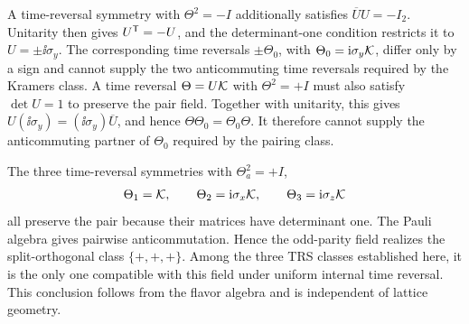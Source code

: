 A time-reversal symmetry with $\Theta^2=-I$ additionally satisfies $\overline U U=-I_2$. Unitarity then gives $U^{\mathsf{T}}=-U$, and the determinant-one condition restricts it to $U=\pm\ii\sigma_y$. The corresponding time reversals $\pm\Theta_0$, with $\Theta_0=\mathrm{i}\sigma_y\mathcal{K}$, differ only by a sign and cannot supply the two anticommuting time reversals required by the Kramers class. A time reversal $\Theta=U\mathcal{K}$ with $\Theta^2=+I$ must also satisfy $\det U=1$ to preserve the pair field. Together with unitarity, this gives $U(\ii\sigma_y)=(\ii\sigma_y)\overline U$, and hence $\Theta\Theta_0=\Theta_0\Theta$. It therefore cannot supply the anticommuting partner of $\Theta_0$ required by the pairing class.

The three time-reversal symmetries with $\Theta_a^2=+I$,
\begin{equation}
    \Theta_1=\mathcal{K},\qquad
    \Theta_2=\mathrm{i}\sigma_x\mathcal{K},\qquad
    \Theta_3=\mathrm{i}\sigma_z\mathcal{K}
    \label{eq:trs_odd_pair_three_plus_TR}
\end{equation}
all preserve the pair because their matrices have determinant one. The Pauli algebra gives pairwise anticommutation. Hence the odd-parity field realizes the split-orthogonal class $\{+,+,+\}$. Among the three TRS classes established here, it is the only one compatible with this field under uniform internal time reversal. This conclusion follows from the flavor algebra and is independent of lattice geometry.

